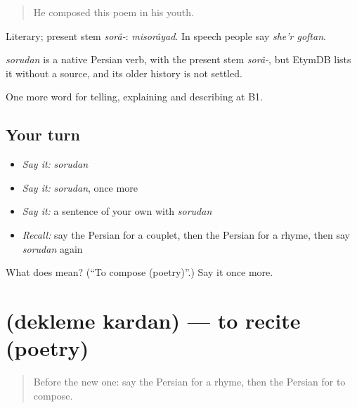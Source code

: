\begin{quote}
He composed this poem in his youth.
\end{quote}

Literary; present stem \emph{sorâ-}: \emph{misorâyad}. In speech people say \emph{she'r goftan}.

\begin{cousinweb}
\emph{sorudan} is a native Persian verb, with the present stem \emph{sorâ-}, but EtymDB lists it without a source, and its older history is not settled.
\end{cousinweb}

\begin{grammarlens}[title={What you've built}]
One more word for telling, explaining and describing at B1.
\end{grammarlens}

\subsection*{Your turn}
\begin{itemize}
\raggedright
  \item \emph{Say it:} \emph{sorudan}
  \item \emph{Say it:} \emph{sorudan}, once more
  \item \emph{Say it:} a sentence of your own with \emph{sorudan}
  \item \emph{Recall:} say the Persian for a couplet, then the Persian for a rhyme, then say \emph{sorudan} again
\end{itemize}

\begin{tcolorbox}[breakable,colback=teal!4,colframe=teal!35!black,title={Before you move on}]
What does  mean? (\textquotedblleft{}To compose (poetry)\textquotedblright{}.) Say it once more.
\end{tcolorbox}
\section[\texorpdfstring{\fa{دکلمه} \fa{کردن} (dekleme kardan)}{دکلمه کردن (dekleme kardan)}]{  (dekleme kardan) — to recite (poetry)}

\label{lesson:FA-C522-dekleme-kardan}



\begin{quote}
Before the new one: say the Persian for a rhyme, then the Persian for to compose.
\end{quote}

